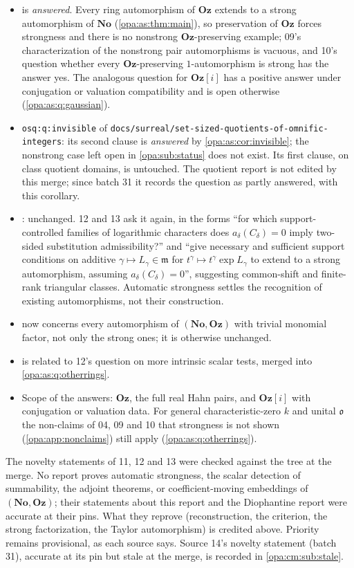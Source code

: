 \documentclass[11pt,oneside]{article}
\numberwithin{equation}{section}
\theoremstyle{definition}
\theoremstyle{remark}
\newcommand{\No}{\mathbf{No}}
\newcommand{\Oz}{\mathbf{Oz}}
\newcommand{\Og}{\mathbf{Oz}[i]}
\newcommand{\oo}{\mathfrak o}
\newcommand{\mm}{\mathfrak m}
\newcommand{\lbl}[1]{\nolinkurl{#1}}
\newcommand{\fn}[1]{\nolinkurl{#1}}
\begin{document}
\begin{itemize}[itemsep=2pt]
\item {} is \emph{answered}. Every ring automorphism of $\Oz$ extends to a strong
automorphism of $\No$ (\cref{opa:as:thm:main}), so preservation of $\Oz$ forces strongness and there is no
nonstrong $\Oz$-preserving example; 09's characterization of the nonstrong pair automorphisms is vacuous, and
10's question whether every $\Oz$-preserving $1$-automorphism is strong has the answer yes. The analogous
question for $\Og$ has a positive answer under conjugation or valuation compatibility and is open otherwise
(\cref{opa:as:q:gaussian}).
\item \lbl{osq:q:invisible} of \fn{docs/surreal/set-sized-quotients-of-omnific-integers}: its second clause
is \emph{answered} by \cref{opa:as:cor:invisible}; the nonstrong case left open in \cref{opa:sub:status}
does not exist. Its first clause, on class quotient domains, is untouched. The quotient report is not edited
by this merge; since batch 31 it records the question as partly answered, with this corollary.
\item {}: unchanged. 12 and 13 ask it again, in the forms ``for which support-controlled
families of logarithmic characters does $a_\delta(C_\delta)=0$ imply two-sided substitution admissibility?''
and ``give necessary and sufficient support conditions on additive $\gamma\mapsto L_\gamma\in\mm$ for
$t^\gamma\mapsto t^\gamma\exp L_\gamma$ to extend to a strong automorphism, assuming $a_\delta(C_\delta)=0$'',
suggesting common-shift and finite-rank triangular classes. Automatic strongness settles the recognition of
existing automorphisms, not their construction.
\item {} now concerns every automorphism of $(\No,\Oz)$ with trivial monomial factor,
not only the strong ones; it is otherwise unchanged.
\item {} is related to 12's question on more intrinsic scalar tests, merged into
\cref{opa:as:q:otherrings}.
\item Scope of the answers: $\Oz$, the full real Hahn pairs, and $\Og$ with conjugation or valuation data.
For general characteristic-zero $k$ and unital $\oo$ the non-claims of 04, 09 and 10 that strongness is not
shown (\cref{opa:app:nonclaims}) still apply (\cref{opa:as:q:otherrings}).
\end{itemize}

The novelty statements of 11, 12 and 13 were checked against the tree at the merge. No report proves automatic
strongness, the scalar detection of summability, the adjoint theorems, or coefficient-moving embeddings of
$(\No,\Oz)$; their statements about this report and the Diophantine report were accurate at their pins. What
they reprove (reconstruction, the criterion, the strong factorization, the Taylor automorphism) is credited
above. Priority remains provisional, as each source says. Source 14's novelty statement (batch 31), accurate at
its pin but stale at the merge, is recorded in \cref{opa:cm:sub:stale}.
\end{document}
